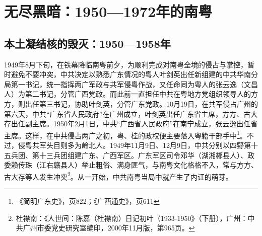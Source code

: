 \chapter{无尽黑暗：1950—1972年的南粤}

\section{本土凝结核的毁灭：1950—1958年}

\indent 1949年8月下旬，在铁幕降临南粤前夕，为顺利完成对南粤全境的侵占与掌控，暂时避免不要冲突，中共决定以熟悉广东情况的粤人叶剑英出任新组建的中共华南分局第一书记，统一指挥两广军政与共军侵粤作战，又任命同为粤人的张云逸（文昌人）为第二书记，分管广西党政。而此前一直担任中共在粤地方党组织领导人的方方，则出任第三书记，协助叶剑英，分管广东党政。10月19日，在共军侵占广州的第六天，中共“广东省人民政府”在广州成立，叶剑英出任广东省主席，方方、古大存出任副主席。1950年2月1日，中共“广西省人民政府”在南宁成立，张云逸出任省主席。这样，在中共侵占两广之初，粤、桂的政权便主要落入粤籍干部手中\footnote{《简明广东史》，页822；《广西通史》，页611}。不过，侵粤共军头目则多为岭北人。1949年11月9日、12月9日，中共分别以四野第十五兵团、第十三兵团组建广东、广西军区。广东军区司令邓华（湖湘郴县人）、政委赖传珠（江右赣县人）举止粗俗、满身匪气，与南粤文化格格不入，常与方方、古大存等人发生冲突\footnote{杜襟南：《人世间：陈嘉（杜襟南）日记初叶（1933-1950》（下册），广州：中共广州市委党史研究室编印，2000年11月版，第965页。}。从一开始，中共南粤当局中就产生了内讧的萌芽。

